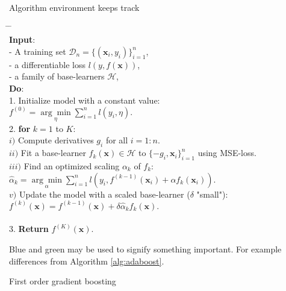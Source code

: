 \begin{frame}[fragile]{Algorithm environment keeps track}
	\begin{algorithm}[H]
		\scriptsize{
			\begin{tabbing}
				\hspace{2em} \= \hspace{2em} \= \hspace{2em} \= \\
				{\bfseries Input}: \\
				\> - A training set $\mathcal{D}_n=\{(\mathbf{x}_i, y_{i})\}_{i=1}^n$,\\
				\> - a differentiable loss $l(y,f(\mathbf{x}))$,\\
				\> - a family of base-learners $\mathcal{H}$,\\
				
				{\bfseries Do}: \\
				1. Initialize model with a constant value:\\
				\> $f^{(0)} = \underset{\eta}{\arg\min} \sum_{i=1}^n l(y_i, \eta).$\\
				
				2. {\bfseries for} $k = 1$ to $K$: \\
				
				\>	$i)$ \colorbox{blue!20}{Compute derivatives $g_i$ for all $i=1:n$.}\\
				
				\> $ii)$ \colorbox{green!20}{Fit a base-learner $f_k(\mathbf{x})\in\mathcal{H}$ to $\{-g_i,\mathbf{x}_i\}_{i=1}^n$ using MSE-loss.}\\
				
				\> $iii)$ Find an optimized scaling $\alpha_k$ of $f_k$:\\
				\>\> $\hat\alpha_k = \underset{\alpha}{\arg\min} \sum_{i=1}^n l(y_i, f^{(k-1)}(\mathbf{x}_i)+\alpha f_k(\mathbf{x}_i) )$.\\
				
				\>	$v)$ Update the model with a scaled base-learner ($\delta$ "small"):
				$f^{(k)}(\mathbf{x}) = f^{(k-1)}(\mathbf{x}) + \delta \hat\alpha_k f_k(\mathbf{x}).$\\
				\hspace{0.4cm}{\bfseries end for} \\
				
				3. {\bfseries Return} $f^{(K)}(\mathbf{x})$.%
			\end{tabbing}
			\colorbox{blue!20}{Blue} and \colorbox{green!20}{green} may be used to signify something important.
			For example differences from Algorithm \ref{alg:adaboost}.
			\vspace{0.5cm}
			
			\caption{First order gradient boosting}
		}
	\end{algorithm}
\end{frame}

